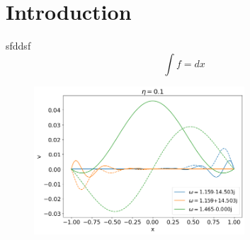 \chapter{Introduction}
sfddsf
\[ \int f = dx \]
\begin{figure}[H]
    \centering
    \includegraphics*[width=0.7\textwidth]{./img/constant_v/eigenfuncs-eta=0.1.png}
\end{figure}
